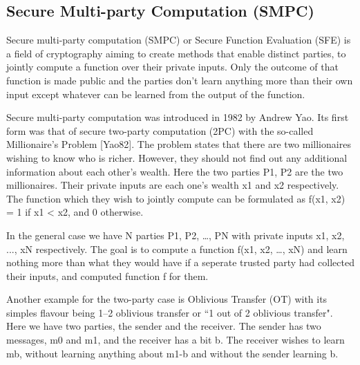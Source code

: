 \subsection{Secure Multi-party Computation (SMPC)}
Secure multi-party computation (SMPC) or Secure Function Evaluation (SFE) is a field of cryptography aiming to create methods that enable distinct parties, to jointly compute a function over their private inputs.
Only the outcome of that function is made public and the parties don’t learn anything more than their own input except whatever can be learned from the output of the function.

Secure multi-party computation was introduced in 1982 by Andrew Yao.
Its first form was that of secure two-party computation (2PC) with the so-called Millionaire's Problem [Yao82].
The problem states that there are two millionaires wishing to know who is richer.
However, they should not find out any additional information about each other’s wealth.
Here the two parties P1, P2 are the two millionaires.
Their private inputs are each one’s wealth x1 and x2 respectively.
The function which they wish to jointly compute can be formulated as f(x1, x2) = 1 if x1 < x2, and 0 otherwise.

In the general case we have N parties P1, P2, …, PN with private inputs x1, x2, ..., xN respectively.
The goal is to compute a function f(x1, x2, …, xN) and learn nothing more than what they would have if a seperate trusted party had collected their inputs, and computed function f for them.

Another example for the two-party case is Oblivious Transfer (OT) with its simples flavour being 1–2 oblivious transfer or ``1 out of 2 oblivious transfer".
Here we have two parties, the sender and the receiver.
The sender has two messages, m0 and m1, and the receiver has a bit b. The receiver wishes to learn mb, without learning anything about m1-b and without the sender learning b.